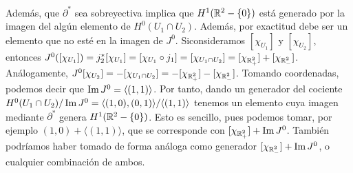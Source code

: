 \documentclass[CV.tex]{subfiles}
\begin{document}
\begin{ej}
Además, que $\partial^*$ sea sobreyectiva implica que $H^1(\mathbb{R}^2-\{0\})$ está generado por la imagen del algún elemento de $H^0(U_1\cap U_2)$. Además, por exactitud debe ser un elemento que no esté en la imagen de $J^0$. Siconsideramos $[\chi_{U_1}]$ y $[\chi_{U_2}]$, entonces $J^0([\chi_{U_1}])=j_2^*[\chi_{U_1}]=[\chi_{U_1}\circ j_1]=[\chi_{U_1\cap U_2}]=[\chi_{\mathbb{R}^2_+}]+[\chi_{\mathbb{R}^2_-}]$. Análogamente, $J^0[\chi_{U_2}]=-[\chi_{U_1\cap U_2}]=-[\chi_{\mathbb{R}^2_+}]-[\chi_{\mathbb{R}^2_-}]$. Tomando coordenadas, podemos decir que $\operatorname{Im}{J^0}=\langle (1,1)\rangle$. Por tanto, dando un generador del cociente $H^0(U_1\cap U_2)/\operatorname{Im}{J^0}=\langle (1,0),(0,1)\rangle/\langle (1,1)\rangle$ tenemos un elemento cuya imagen mediante $\partial^*$ genera $H^1(\mathbb{R}^2-\{0\})$. Esto es sencillo, pues podemos tomar, por ejemplo $(1,0)+\langle (1,1)\rangle$, que se corresponde con $[\chi_{\mathbb{R}^2_+}]+\operatorname{Im}{J^0}$. También podríamos haber tomado de forma análoga como generador $[\chi_{\mathbb{R}^2_-}]+\operatorname{Im}{J^0}$, o cualquier combinación de ambos.
\end{ej}
\end{document}
